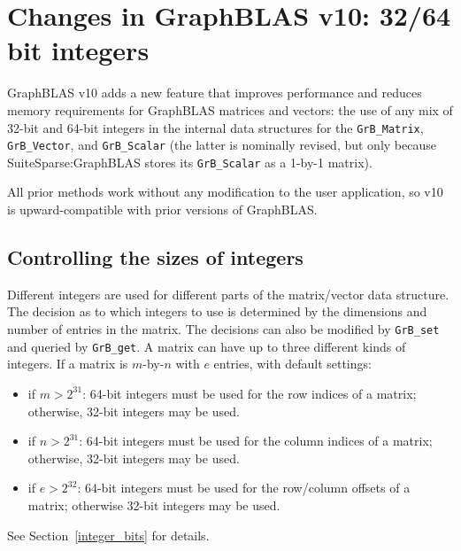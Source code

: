 
\newpage
\section{Changes in GraphBLAS v10: 32/64 bit integers}

GraphBLAS v10 adds a new feature that improves performance and reduces memory
requirements for GraphBLAS matrices and vectors:  the use of any mix of 32-bit
and 64-bit integers in the internal data structures for the \verb'GrB_Matrix',
\verb'GrB_Vector', and \verb'GrB_Scalar' (the latter is nominally revised, but
only because SuiteSparse:GraphBLAS stores its \verb'GrB_Scalar' as a 1-by-1 matrix).

All prior methods work without any modification to the user application,
so v10 is upward-compatible with prior versions of GraphBLAS.

\subsection{Controlling the sizes of integers}

Different integers are used for different parts of the matrix/vector data
structure.  The decision as to which integers to use is determined by the
dimensions and number of entries in the matrix.  The decisions can also be
modified by \verb'GrB_set' and queried by \verb'GrB_get'.  A matrix can have up
to three different kinds of integers.  If a matrix is $m$-by-$n$ with $e$
entries, with default settings:

\begin{itemize}
\item if $m > 2^{31}$: 64-bit integers must be used for the row indices of a
matrix; otherwise, 32-bit integers may be used.
\item if $n > 2^{31}$: 64-bit integers must be used for the column indices of a
matrix; otherwise, 32-bit integers may be used.
\item if $e > 2^{32}$: 64-bit integers must be used for the row/column offsets of
a matrix; otherwise 32-bit integers may be used.
\end{itemize}

See Section~\ref{integer_bits} for details.


